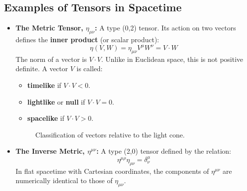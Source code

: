 \documentclass[11pt, a4paper]{report}
\begin{document}
\subsection*{Examples of Tensors in Spacetime}
\begin{itemize}
    \item \textbf{The Metric Tensor, $\eta_{\mu\nu}$:} A type (0,2) tensor. Its action on two vectors defines the \textbf{inner product} (or scalar product):
    \begin{equation}
        \eta(V, W) = \eta_{\mu\nu}V^\mu W^\nu = V \cdot W
    \end{equation}
    The norm of a vector is $V \cdot V$. Unlike in Euclidean space, this is not positive definite. A vector $V$ is called:
    \begin{itemize}
        \item \textbf{timelike} if $V \cdot V < 0$.
        \item \textbf{lightlike} or \textbf{null} if $V \cdot V = 0$.
        \item \textbf{spacelike} if $V \cdot V > 0$.
    \end{itemize}
\begin{figure}[h]
\centering
{}

\caption{Classification of vectors relative to the light cone.}
\end{figure}
    \item \textbf{The Inverse Metric, $\eta^{\mu\nu}$:} A type (2,0) tensor defined by the relation:
    \begin{equation}
        \eta^{\mu\rho}\eta_{\rho\nu} = \delta^\mu_\nu
    \end{equation}
    In flat spacetime with Cartesian coordinates, the components of $\eta^{\mu\nu}$ are numerically identical to those of $\eta_{\mu\nu}$.


\end{itemize}
\end{document}
